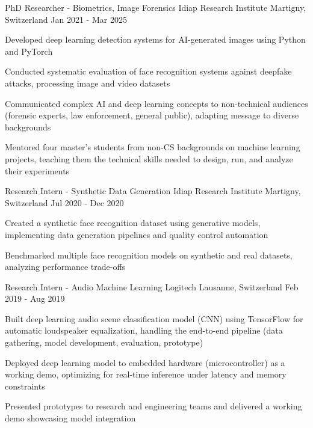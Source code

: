 \begin{cventries}
  \cventry
    {PhD Researcher - Biometrics, Image Forensics} %
    {Idiap Research Institute} %
    {Martigny, Switzerland} %
    {Jan 2021 - Mar 2025} %
    {
      \begin{cvitems} %
        \item {Developed deep learning detection systems for AI-generated images using Python and PyTorch}
        \item {Conducted systematic evaluation of face recognition systems against deepfake attacks, processing image and video datasets}
        \item {Communicated complex AI and deep learning concepts to non-technical audiences (forensic experts, law enforcement, general public), adapting message to diverse backgrounds}
        \item {Mentored four master's students from non-CS backgrounds on machine learning projects, teaching them the technical skills needed to design, run, and analyze their experiments}
      \end{cvitems}
    }

  \cventry
    {Research Intern - Synthetic Data Generation} %
    {Idiap Research Institute} %
    {Martigny, Switzerland} %
    {Jul 2020 - Dec 2020} %
    {
      \begin{cvitems} %
        \item {Created a synthetic face recognition dataset using generative models, implementing data generation pipelines and quality control automation}
        \item {Benchmarked multiple face recognition models on synthetic and real datasets, analyzing performance trade-offs}
      \end{cvitems}
    }

  \cventry
    {Research Intern - Audio Machine Learning} %
    {Logitech} %
    {Lausanne, Switzerland} %
    {Feb 2019 - Aug 2019} %
    {
      \begin{cvitems} %
        \item {Built deep learning audio scene classification model (CNN) using TensorFlow for automatic loudspeaker equalization, handling the end-to-end pipeline (data gathering, model development, evaluation, prototype)}
        \item {Deployed deep learning model to embedded hardware (microcontroller) as a working demo, optimizing for real-time inference under latency and memory constraints}
        \item {Presented prototypes to research and engineering teams and delivered a working demo showcasing model integration}
      \end{cvitems}
    }

\end{cventries}
